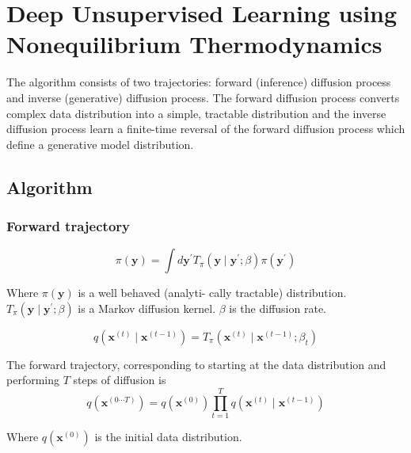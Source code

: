 
\chapter{Deep Unsupervised Learning using Nonequilibrium Thermodynamics}
\label{cha:deep-unsup-learn}


The algorithm consists of two trajectories: forward (inference) diffusion process and inverse (generative) diffusion process.
The forward diffusion process converts complex data distribution into a simple, tractable distribution and the inverse diffusion process learn a finite-time reversal of the forward diffusion process which define a generative model distribution.

\section{Algorithm}
\label{sec:algorithm}



\subsection{Forward trajectory}
\label{sec:forward-trajectory}
\begin{equation}
  \label{eq:18}
  \pi(\mathbf{y})=\int d \mathbf{y}^{\prime} T_\pi\left(\mathbf{y} \mid \mathbf{y}^{\prime} ; \beta\right) \pi\left(\mathbf{y}^{\prime}\right)
\end{equation}

Where \(\pi(\mathbf{y})\) is a well behaved (analyti- cally tractable) distribution.
\(T_\pi\left(\mathbf{y} \mid \mathbf{y}^{\prime} ; \beta\right)\) is a Markov diffusion kernel.
\(\beta\) is the diffusion rate.

\begin{equation}
  \label{eq:29}
  q\left(\mathbf{x}^{(t)} \mid \mathbf{x}^{(t-1)}\right)=T_\pi\left(\mathbf{x}^{(t)} \mid \mathbf{x}^{(t-1)} ; \beta_t\right)
\end{equation}

The forward trajectory, corresponding to starting at the data distribution and performing \(T\) steps of diffusion is
\begin{equation}
  \label{eq:30}
  q\left(\mathbf{x}^{(0 \cdots T)}\right)=q\left(\mathbf{x}^{(0)}\right) \prod_{t=1}^T q\left(\mathbf{x}^{(t)} \mid \mathbf{x}^{(t-1)}\right)
\end{equation}

Where \(q\left(\mathbf{x}^{(0)}\right)\) is the initial data distribution.

